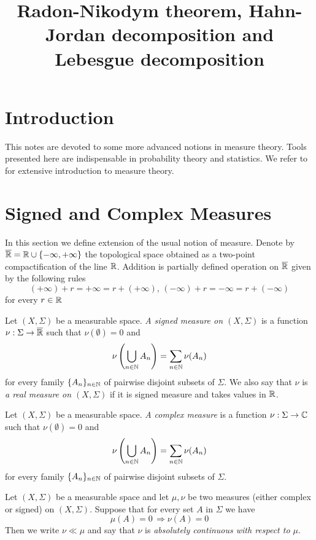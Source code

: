 



\title{Radon-Nikodym theorem, Hahn-Jordan decomposition and Lebesgue decomposition}
\date{}
\maketitle

\section{Introduction}
\noindent
This notes are devoted to some more advanced notions in measure theory. Tools presented here are indispensable in probability theory and statistics. We refer to \cite{Introductiontomeasuretheory} for extensive introduction to measure theory. 

\section{Signed and Complex Measures}
\noindent
In this section we define extension of the usual notion of measure. Denote by $\overline{{\mathbb R}}={\mathbb R}\cup \{-\infty,+\infty\}$ the topological space obtained as a two-point compactification of the line ${\mathbb R}$. Addition is partially defined operation on $\overline{{\mathbb R}}$ given by the following rules
$$(+\infty)+r=+\infty=r+(+\infty),\,(-\infty)+r=-\infty=r+(-\infty)$$
for every $r\in {\mathbb R}$

\begin{definition}
Let $\left(X,\Sigma\right)$ be a measurable space. \textit{A signed measure on $(X,\Sigma)$} is a function $\nu:\Sigma\rightarrow \overline{{\mathbb R}}$ such that $\nu(\emptyset)=0$ and 
$$\nu\left(\bigcup_{n\in {\mathbb N}}A_n\right)=\sum_{n\in {\mathbb N}}\nu(A_n)$$
for every family $\{A_n\}_{n\in {\mathbb N}}$ of pairwise disjoint subsets of $\Sigma$. We also say that $\nu$ is \textit{a real measure on $(X,\Sigma)$} if it is signed measure and takes values in ${\mathbb R}$.
\end{definition}

\begin{definition}
Let $\left(X,\Sigma\right)$ be a measurable space. \textit{A complex measure} is a function $\nu:\Sigma\rightarrow {\mathbb C}$ such that $\nu(\emptyset)=0$ and 
$$\nu\left(\bigcup_{n\in {\mathbb N}}A_n\right)=\sum_{n\in {\mathbb N}}\nu(A_n)$$
for every family $\{A_n\}_{n\in {\mathbb N}}$ of pairwise disjoint subsets of $\Sigma$. 
\end{definition}

\begin{definition}
Let $(X,\Sigma)$ be a measurable space and let $\mu,\nu$ be two measures (either complex or signed) on $(X,\Sigma)$. Suppose that for every set $A$ in $\Sigma$ we have
$$\mu(A) = 0\,\Rightarrow \nu(A)=0$$
Then we write $\nu \ll \mu$ and say that $\nu$ is \textit{absolutely continuous with respect to $\mu$}.
\end{definition}

